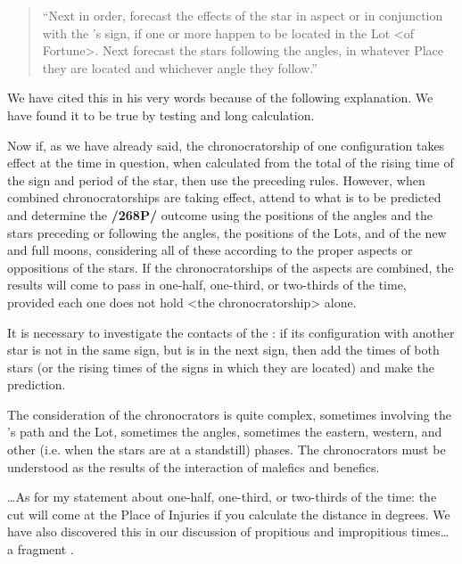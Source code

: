\begin{quote}
“Next in order, forecast the effects of the star in aspect or in conjunction with the \Moon’s sign, if one or more happen to be located in the Lot <of Fortune>. Next forecast the stars following the
angles, in whatever Place they are located and whichever angle they follow.”
\end{quote}

We have cited this in his very words because of the following explanation. We have found it to be true by testing and long calculation.

Now if, as we have already said, the chronocratorship of one configuration takes effect at the time in question, when calculated from the total of the rising time of the sign and period of the star, then use the preceding rules. However, when combined chronocratorships are taking effect, attend to what is to be
predicted and determine the \textbf{/268P/} outcome using the positions of the angles and the stars preceding or following the angles, the positions of the Lots, and of the new and full moons, considering all of these according to the proper aspects or oppositions of the stars. 
If the chronocratorships of the aspects are combined, the results will come to pass in one-half, one-third, or two-thirds of the time, provided each one does not hold <the chronocratorship> alone.

It is necessary to investigate the contacts of the \Moon: if its configuration with another star is not in the same sign, but is in the next sign, then add the times of both stars (or the rising times of the signs in which they are located) and make the prediction. 

The consideration of the chronocrators is quite complex, sometimes involving the \Moon’s path and the Lot, sometimes the angles, sometimes the eastern, western, and other (i.e. when the stars are at a standstill) phases. The chronocrators must be understood as the
results of the interaction of malefics and benefics.

…As for my statement about one-half, one-third, or two-thirds of the time: the cut will come at the Place of Injuries if you calculate the distance in degrees. We have also discovered this in our discussion of
propitious and impropitious times… a fragment .

